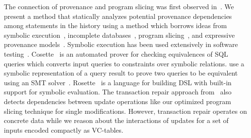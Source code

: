 The connection of provenance and program slicing was %
first observed in~\cite{cheney07}.
%
%
%
We present a method that statically analyzes potential provenance dependencies among statements in the history using a method which borrows ideas from symbolic execution~\cite{bucur14,K76,luckow14}, incomplete databases~\cite{AG85, IL84a, pip10, lenses15}, program slicing~\cite{W81}, and expressive provenance models~\cite{AD11d}.
Symbolic execution has been used extensively in software testing~\cite{cadar13}.
Cosette~\cite{chu2017} is an automated prover for checking equivalences of SQL queries which converts input queries to constraints over symbolic relations.
\cite{zhou-19-autvqequssm} use a symbolic representation of a query result to prove two queries to be equivalent using an SMT solver~\cite{moura-11-smt}.
Rosette~\cite{torlak2014} is a
language for building DSL with built-in support for symbolic evaluation.
The transaction repair approach from~\cite{dashti17} also detects dependencies between update operations like our optimized program slicing technique for single modifications. However, transaction repair operates on concrete data while we reason about the interactions of updates for a set of inputs encoded compactly as VC-tables.


